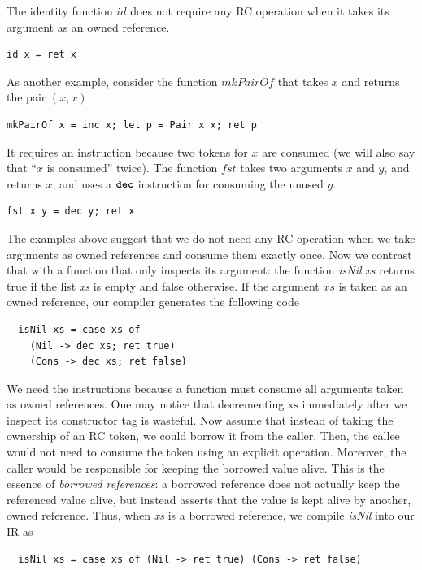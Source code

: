 The identity function $\textit{id}$ does not require any RC operation
when it takes its argument as an owned reference.
\begin{lstlisting}
id x = ret x
\end{lstlisting}
As another example, consider the function $\textit{mkPairOf}$ that takes $x$ and returns the pair $(x, x)$.
\begin{lstlisting}
mkPairOf x = inc x; let p = Pair x x; ret p
\end{lstlisting}
It requires an  instruction because two tokens for $x$ are consumed (we will also say that ``$x$ is consumed'' twice).
The function $\textit{fst}$ takes two arguments $x$ and $y$, and
returns $x$, and uses a $\texttt{\textbf{dec}}$ instruction for consuming the unused $y$.
\begin{lstlisting}
fst x y = dec y; ret x
\end{lstlisting}
The examples above suggest that we do not need any RC operation when
we take arguments as owned references and consume them exactly
once. Now we contrast that with a function that only inspects its argument:
the function \textit{isNil} \textit{xs} returns
true if the list \textit{xs} is empty and false otherwise. If the argument $\textit{xs}$ is taken as an
owned reference, our compiler generates the following code
\begin{lstlisting}
  isNil xs = case xs of
    (Nil -> dec xs; ret true)
    (Cons -> dec xs; ret false)
\end{lstlisting}
We need the  instructions because a function must consume all
arguments taken as owned references.  One may notice that decrementing
$\text{xs}$ immediately after we inspect its constructor tag is
wasteful. Now assume that instead of taking the ownership of an RC
token, we could borrow it from the caller.  Then, the callee would not
need to consume the token using an explicit  operation. Moreover,
the caller would be responsible for keeping the borrowed value alive.
This is the essence of \emph{borrowed references}: a borrowed reference does not actually keep the referenced value
alive, but instead asserts that the value is kept alive by another, owned reference.
Thus, when \textit{xs} is a borrowed reference, we compile \textit{isNil} into our IR as
\begin{lstlisting}
  isNil xs = case xs of (Nil -> ret true) (Cons -> ret false)
\end{lstlisting}

